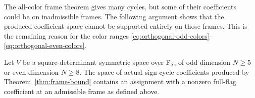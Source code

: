 The all-color frame theorem gives many cycles, but some of their
coefficients could be on inadmissible frames.  The following argument
shows that the produced coefficient space cannot be supported entirely
on those frames.  This is the remaining reason for the color ranges
\eqref{eq:orthogonal-odd-colors}--\eqref{eq:orthogonal-even-colors}.

\begin{lemma}\label{lem:orthogonal-five-colors}
Let $V$ be a square-determinant symmetric space over $\mathbb F_5$, of odd
dimension $N\ge5$ or even dimension $N\ge8$.  The space of actual sign
cycle coefficients produced by Theorem~\ref{thm:frame-bound} contains
an assignment with a nonzero full-flag coefficient at an admissible
frame as defined above.
\end{lemma}

